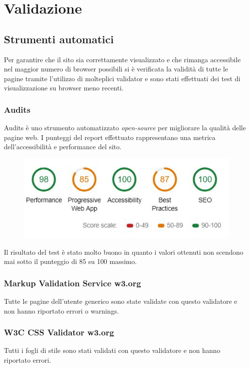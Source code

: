 
\section{Validazione}



\subsection{Strumenti automatici}
Per garantire che il sito sia correttamente visualizzato e che rimanga accessibile nel maggior numero di browser possibili si è verificata la validità di tutte le pagine tramite l'utilizzo di molteplici validator e sono stati effettuati dei test di visualizzazione su browser meno recenti.

\subsubsection{Audits}
Audits è uno strumento automatizzato \textit{open-source} per migliorare la qualità delle pagine web.
I punteggi del report effettuato rappresentano una metrica dell'accessibilità e performance del sito.
\begin{figure}[H]
	\centerline{\includegraphics[scale= 0.65]{img/punteggiAudits.jpg}}
\end{figure}
Il risultato del test è stato molto buono in quanto i valori ottenuti non scendono mai sotto il punteggio di 85 su 100 massimo. 

\subsubsection{Markup Validation Service w3.org}
Tutte le pagine dell'utente generico sono state validate con questo validatore e non hanno riportato errori o warnings.

\subsubsection{W3C CSS Validator w3.org}
Tutti i fogli di stile sono stati validati con questo validatore e non hanno riportato errori.

